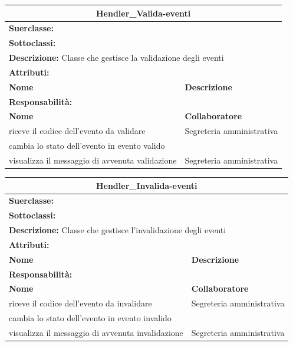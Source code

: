 \documentclass[11pt]{article}
\begin{document}
\begin{table}[H]
\centering
\begin{tabularx}{1\textwidth}{|X|X|}\hline
\multicolumn{2}{|c|}{\textbf{Hendler\_Valida-eventi}}\\\hline
\multicolumn{2}{|l|}{\textbf{Suerclasse:}}\\\hline
\multicolumn{2}{|l|}{\textbf{Sottoclassi:}}\\\hline
\multicolumn{2}{|l|}{\textbf{Descrizione:} Classe che gestisce la validazione degli eventi}\\\hline
\multicolumn{2}{|l|}{\textbf{Attributi:}}\\
\textbf{Nome} & \textbf{Descrizione}\\
\hline
\multicolumn{2}{|l|}{\textbf{Responsabilità:}}\\
\textbf{Nome} & \textbf{Collaboratore}\\
riceve il codice dell'evento da validare & Segreteria amministrativa\\
cambia lo stato dell'evento in evento valido &\\
visualizza il messaggio di avvenuta validazione & Segreteria amministrativa\\
\hline
\end{tabularx}
\end{table}


\begin{table}[H]
\centering
\begin{tabularx}{1\textwidth}{|X|X|}\hline
\multicolumn{2}{|c|}{\textbf{Hendler\_Invalida-eventi}}\\\hline
\multicolumn{2}{|l|}{\textbf{Suerclasse:}}\\\hline
\multicolumn{2}{|l|}{\textbf{Sottoclassi:}}\\\hline
\multicolumn{2}{|l|}{\textbf{Descrizione:} Classe che gestisce l'invalidazione degli eventi}\\\hline
\multicolumn{2}{|l|}{\textbf{Attributi:}}\\
\textbf{Nome} & \textbf{Descrizione}\\
\hline
\multicolumn{2}{|l|}{\textbf{Responsabilità:}}\\
\textbf{Nome} & \textbf{Collaboratore}\\
riceve il codice dell'evento da invalidare & Segreteria amministrativa\\
cambia lo stato dell'evento in evento invalido &\\
visualizza il messaggio di avvenuta invalidazione & Segreteria amministrativa\\
\hline
\end{tabularx}
\end{table}
\end{document}

